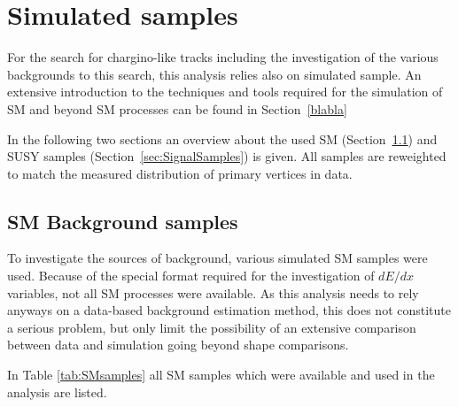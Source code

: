 \section{Simulated samples}
\label{sec:SimulatedSamples}

For the search for chargino-like tracks including the investigation of the various backgrounds to this search, this analysis relies also on simulated sample.
An extensive introduction to the techniques and tools required for the simulation of SM and beyond SM processes can be found in Section~\ref{blabla}

In the following two sections an overview about the used SM (Section~\ref{sec:SMSamples}) and SUSY samples (Section~\ref{sec:SignalSamples}) is given.
All samples are reweighted to match the measured distribution of primary vertices in data.


\subsection{SM Background samples}
\label{sec:SMSamples}
To investigate the sources of background, various simulated SM samples were used.
Because of the special format required for the investigation of $dE/dx$ variables, not all SM processes were available.
As this analysis needs to rely anyways on a data-based background estimation method, 
this does not constitute a serious problem, but only limit the possibility of an extensive comparison between data and simulation going beyond shape comparisons.

In Table \ref{tab:SMsamples} all SM samples which were available and used in the analysis are listed.


